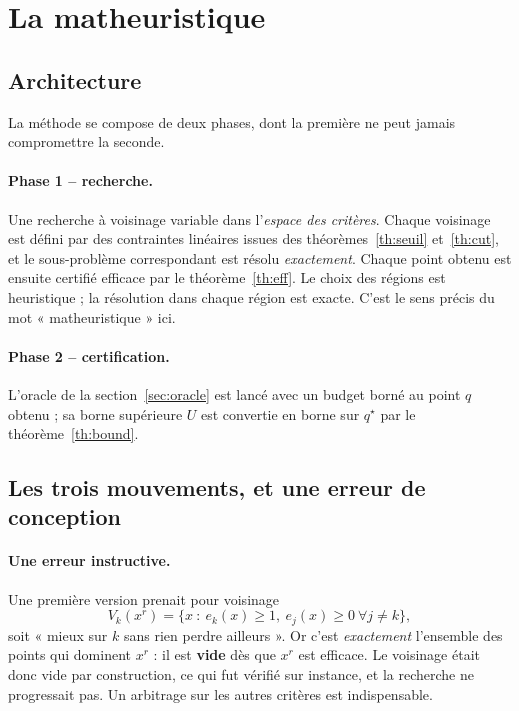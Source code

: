 \documentclass[11pt,a4paper]{article}
\theoremstyle{plain}
\theoremstyle{remark}
\newcommand{\qs}{q^{\star}}
\begin{document}
\section{La matheuristique}

\subsection{Architecture}

La méthode se compose de deux phases, dont la première ne peut jamais
compromettre la seconde.

\paragraph{Phase 1 -- recherche.} Une recherche à voisinage variable dans
l'\emph{espace des critères}. Chaque voisinage est défini par des contraintes
linéaires issues des théorèmes~\ref{th:seuil} et~\ref{th:cut}, et le
sous-problème correspondant est résolu \emph{exactement}. Chaque point obtenu
est ensuite certifié efficace par le théorème~\ref{th:eff}. Le choix des
régions est heuristique ; la résolution dans chaque région est exacte. C'est
le sens précis du mot « matheuristique » ici.

\paragraph{Phase 2 -- certification.} L'oracle de la
section~\ref{sec:oracle} est lancé avec un budget borné au point $q$ obtenu ;
sa borne supérieure $U$ est convertie en borne sur $\qs$ par le
théorème~\ref{th:bound}.

\subsection{Les trois mouvements, et une erreur de conception}

\paragraph{Une erreur instructive.} Une première version prenait pour
voisinage
\[
  V_k(x^r)=\{x\ :\ e_k(x)\ge 1,\ e_j(x)\ge 0\ \forall j\ne k\},
\]
soit « mieux sur $k$ sans rien perdre ailleurs ». Or c'est \emph{exactement}
l'ensemble des points qui dominent $x^r$ : il est \textbf{vide} dès que $x^r$
est efficace. Le voisinage était donc vide par construction, ce qui fut
vérifié sur instance, et la recherche ne progressait pas. Un arbitrage sur
les autres critères est indispensable.
\end{document}
